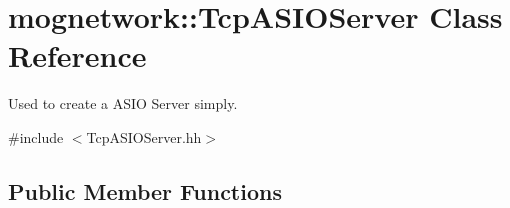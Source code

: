\hypertarget{classmognetwork_1_1_tcp_a_s_i_o_server}{\section{mognetwork\-:\-:Tcp\-A\-S\-I\-O\-Server Class Reference}
\label{classmognetwork_1_1_tcp_a_s_i_o_server}
}


Used to create a A\-S\-I\-O Server simply.  




{\ttfamily \#include $<$Tcp\-A\-S\-I\-O\-Server.\-hh$>$}

\subsection*{Public Member Functions}
